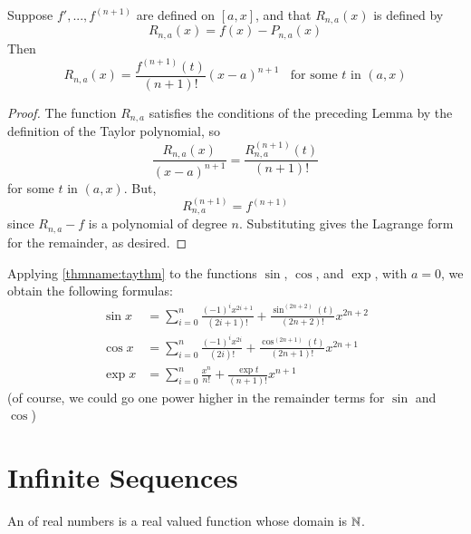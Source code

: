 \begin{namthm}\label{thmname:taythm}
    Suppose $f',...,f^{(n+1)}$ are defined on $[a,x]$, and that $R_{n,a}(x)$ is defined by \begin{equation*}
        R_{n,a}(x) = f(x) - P_{n,a}(x)
    \end{equation*}
    Then \begin{equation*}
        R_{n,a}(x) = \frac{f^{(n+1)}(t)}{(n+1)!}(x-a)^{n+1}\;\;\text{ for some $t$ in } (a,x)
    \end{equation*}
\end{namthm}
\begin{proof}
    The function $R_{n,a}$ satisfies the conditions of the preceding Lemma by the definition of the Taylor polynomial, so \begin{equation*}
        \frac{R_{n,a}(x)}{(x-a)^{n+1}} = \frac{R_{n,a}^{(n+1)}(t)}{(n+1)!}
    \end{equation*}
    for some $t$ in $(a,x)$. But, \begin{equation*}
        R_{n,a}^{(n+1)} = f^{(n+1)}
    \end{equation*}
    since $R_{n,a} - f$ is a polynomial of degree $n$. Substituting gives the Lagrange form for the remainder, as desired.
\end{proof}

\begin{eg}
    Applying \ref{thmname:taythm} to the functions $\sin$, $\cos$, and $\exp$, with $a = 0$, we obtain the following formulas: \begin{align*}
        \sin x &= \sum\limits_{i=0}^n\frac{(-1)^ix^{2i+1}}{(2i+1)!} + \frac{\sin^{(2n+2)}(t)}{(2n+2)!}x^{2n+2} \\
        \cos x &= \sum\limits_{i=0}^n\frac{(-1)^ix^{2i}}{(2i)!} + \frac{\cos^{(2n+1)}(t)}{(2n+1)!}x^{2n+1} \\
        \exp x &= \sum\limits_{i=0}^n\frac{x^n}{n!} + \frac{\exp t}{(n+1)!}x^{n+1}
    \end{align*}
    (of course, we could go one power higher in the remainder terms for $\sin$ and $\cos$)
\end{eg}


\section{Infinite Sequences}

\begin{defn}
    An  of real numbers is a real valued function whose domain is $\mathbb N$.
\end{defn}


